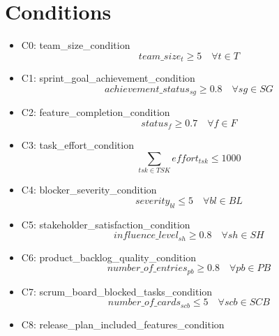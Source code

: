 \documentclass{article}
\begin{document}
\section{Conditions}
\begin{itemize}
    \item C0: team\_size\_condition
        \begin{equation*}
            team\_size_{t} \geq 5 \quad \forall t \in T
        \end{equation*}
    \item C1: sprint\_goal\_achievement\_condition
        \begin{equation*}
            achievement\_status_{sg} \geq 0.8 \quad \forall sg \in SG
        \end{equation*}
    \item C2: feature\_completion\_condition
        \begin{equation*}
            status_{f} \geq 0.7 \quad \forall f \in F
        \end{equation*}
    \item C3: task\_effort\_condition
        \begin{equation*}
            \sum_{tsk \in TSK} effort_{tsk} \leq 1000
        \end{equation*}
    \item C4: blocker\_severity\_condition
        \begin{equation*}
            severity_{bl} \leq 5 \quad \forall bl \in BL
        \end{equation*}
    \item C5: stakeholder\_satisfaction\_condition
        \begin{equation*}
            influence\_level_{sh} \geq 0.8 \quad \forall sh \in SH
        \end{equation*}
    \item C6: product\_backlog\_quality\_condition
        \begin{equation*}
            number\_of\_entries_{pb} \geq 0.8 \quad \forall pb \in PB
        \end{equation*}
    \item C7: scrum\_board\_blocked\_tasks\_condition
        \begin{equation*}
            number\_of\_cards_{scb} \leq 5 \quad \forall scb \in SCB
        \end{equation*}
    \item C8: release\_plan\_included\_features\_condition
        \begin{equation*}

\end{equation*}
\end{itemize}
\end{document}
